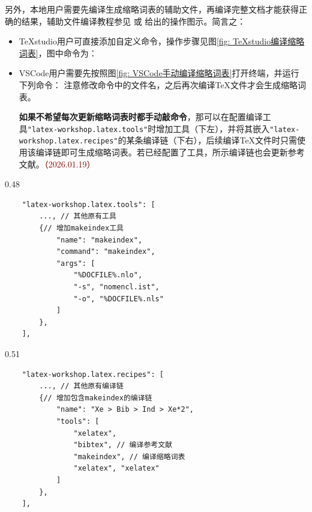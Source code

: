 \documentclass[doctor, vlined, ]{DissertUESTC}
\begin{document}
	另外，本地用户需要先编译生成缩略词表的辅助文件，再编译完整文档才能获得正确的结果，辅助文件编译教程参见\href{https://zhuanlan.zhihu.com/p/46442713}{\color{DarkRed}} 或 \href{https://github.com/MGG1996/DissertationUESTC?tab=readme-ov-file#6-目录图目录表目录主要符号表缩略词表}{\color{DarkRed}}给出的操作图示。简言之：
	\begin{itemize}
		\item TeXstudio用户可直接添加自定义命令，操作步骤见图\ref{fig: TeXstudio编译缩略词表}，图中命令为：\newline
		\item VSCode用户需要先按照图\ref{fig: VSCode手动编译缩略词表}打开终端，并运行下列命令：\newline
		\newline
		注意修改命令中的文件名，之后再次编译TeX文件才会生成缩略词表。
		
		\textbf{\color{DarkRed}如果不希望每次更新缩略词表时都手动敲命令}，那可以在配置编译工具\verb*|"latex-workshop.latex.tools"|时增加工具（下左），并将其嵌入\verb*|"latex-workshop.latex.recipes"|的某条编译链（下右），后续编译TeX文件时只需使用该编译链即可生成缩略词表。若已经配置了工具，所示编译链也会更新参考文献。\textcolor{DarkRed}{（2026.01.19）}
	\end{itemize}
	\begin{boxedminipage}[t]{0.48\linewidth}
		\vspace*{5pt}%
		\begin{verbatim}
	"latex-workshop.latex.tools": [
		..., // 其他原有工具
		{// 增加makeindex工具
			"name": "makeindex",
			"command": "makeindex",
			"args": [
				"%DOCFILE%.nlo",
				"-s", "nomencl.ist",
				"-o", "%DOCFILE%.nls"
			]
		},
	],
		\end{verbatim}
	\end{boxedminipage}
	\begin{boxedminipage}[t]{0.51\linewidth}
		\vspace*{5pt}
		\begin{verbatim}
	"latex-workshop.latex.recipes": [
		..., // 其他原有编译链
		{// 增加包含makeindex的编译链
			"name": "Xe > Bib > Ind > Xe*2",
			"tools": [
				"xelatex",
				"bibtex", // 编译参考文献
				"makeindex", // 编译缩略词表
				"xelatex", "xelatex"
			]
		},
	],
		\end{verbatim}
	\end{boxedminipage}
	
\end{document}
